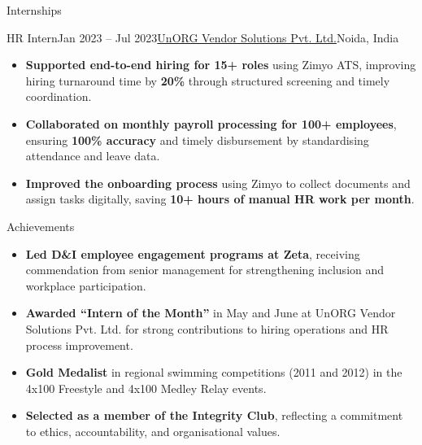 \documentclass[hidelinks]{resume}
\begin{document}
\begin{rSection}{Internships}
    \begin{rSubsection}{HR Intern}{Jan 2023 -- Jul 2023}{\href{https://www.unorg.in/}{UnORG Vendor Solutions Pvt. Ltd.}}{Noida, India}
        \begin{itemize}[leftmargin=1.2em, itemsep=0pt, parsep=0pt, topsep=0pt, partopsep=0pt]
            \item \textcolor{neutral}{\textbf{Supported end-to-end hiring for 15+ roles}} using Zimyo ATS, improving hiring turnaround time by \textcolor{primary}{\textbf{20\%}} through structured screening and timely coordination.
            \item \textcolor{neutral}{\textbf{Collaborated on monthly payroll processing for 100+ employees}}, ensuring \textcolor{primary}{\textbf{100\% accuracy}} and timely disbursement by standardising attendance and leave data.
            \item \textcolor{neutral}{\textbf{Improved the onboarding process}} using Zimyo to collect documents and assign tasks digitally, saving \textcolor{primary}{\textbf{10+ hours of manual HR work per month}}.
        \end{itemize}
    \end{rSubsection}
\end{rSection}

\begin{rSection}{Achievements}
    \begin{itemize}[leftmargin=1.2em, itemsep=0pt, parsep=0pt, topsep=0pt, partopsep=0pt]
        \item \textcolor{neutral}{\textbf{Led D\&I employee engagement programs at Zeta}}, receiving commendation from senior management for strengthening inclusion and workplace participation.
        \item \textcolor{neutral}{\textbf{Awarded ``Intern of the Month''}} in May and June at UnORG Vendor Solutions Pvt. Ltd. for strong contributions to hiring operations and HR process improvement.
        \item \textcolor{neutral}{\textbf{Gold Medalist}} in regional swimming competitions (2011 and 2012) in the 4x100 Freestyle and 4x100 Medley Relay events.
        \item \textcolor{neutral}{\textbf{Selected as a member of the Integrity Club}}, reflecting a commitment to ethics, accountability, and organisational values.
    \end{itemize}
\end{rSection}
\end{document}
